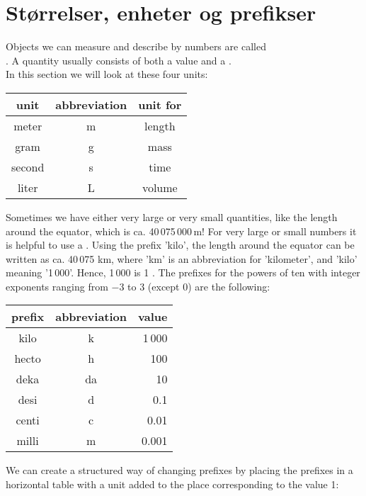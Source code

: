 





\section{Størrelser, enheter og prefikser}
Objects we can measure and describe by numbers are called \\. A quantity usually consists of both a value and a . \\In this section we will look at these four units:
\tbs
\begin{center}
	\begin{tabular}{c|c|c}
		\textbf{unit} & \textbf{abbreviation} &\textbf{unit for}\\ \hline
		meter & m &length\\\hline
		gram & g &mass\\\hline
		second & s & time\\\hline 
		liter & L & volume
	\end{tabular}
\end{center}\tbs
Sometimes we have either very large or very small quantities, like the length around the equator, which is ca. 40\,075\,000\,m! For very large or small numbers it is helpful to use a . Using the prefix 'kilo', the length around the equator can be written as ca. 40\,075 km, where 'km' is an abbreviation for 'kilometer', and 'kilo' meaning '1\,000'. Hence, 1\,000 is 1 . The prefixes for the powers of ten with integer exponents ranging from $ -3 $ to 3 (except 0) are the following:\tbs
\begin{center}
	\begin{tabular}{c|c|r}
		\textbf{prefix} & \textbf{abbreviation}&\textbf{value} \\ \hline
		kilo & k & 1\,000\phantom{000\;}\\\hline
		hecto & h & 100\phantom{000\;}\\\hline
		deka & da & 10\phantom{000\;}\\\hline
		desi & d & 0.1\phantom{0\,\;}\\\hline
		centi & c & 0.01\phantom{\,\;}\\\hline
		milli & m & 0.001\\\hline		
	\end{tabular}
\end{center}
\newpage
We can create a structured way of changing prefixes by placing the prefixes in a horizontal table with a unit added to the place corresponding to the value 1: \regv

